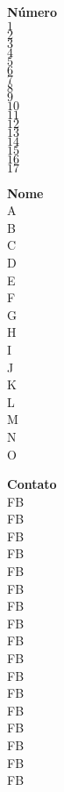 \documentclass[a4paper,10pt]{article}
\begin{document}
\begin{multicols}{3}	
\begin{center} {\bf N\'umero} \\
$1$\\
$2$\\
$3$\\
$4$\\
$5$\\
$6$\\
$7$\\
$8$\\
$9$\\
$10$\\
$11$\\
$12$\\
$13$\\
$14$\\
$15$\\
$16$\\
$17$\\
\end{center}

\columnbreak
\begin{center} {\bf Nome}  \\
A\\
B\\
C\\
D\\
E\\
F\\
G\\
H\\
I\\
J\\
K\\
L\\ 
M\\
N\\
O\\
\end{center}

\columnbreak
\begin{center} {\bf Contato} \\
FB\\
FB\\
FB\\
FB\\
FB\\
FB\\
FB\\
FB\\
FB\\
FB\\
FB\\
FB\\
FB\\
FB\\ 
FB\\
FB\\
FB\\
\end{center}
\end{multicols}


\clearpage
\end{document}
